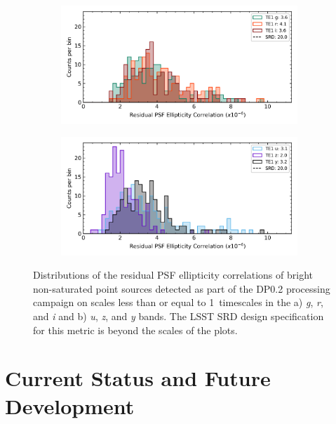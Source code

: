 \begin{figure}[h!]
\begin{subfigure}{.5\textwidth}
    \centering
    \includegraphics[width=0.98\textwidth]{figures/dp02_te1_alltracts_gri}
\end{subfigure}
\begin{subfigure}{.5\textwidth}
    \centering
    \includegraphics[width=0.98\textwidth]{figures/dp02_te1_alltracts_uzy}
\end{subfigure}
\par\medskip
\caption{\label{fig:faro_dp02_distr_te1}
Distributions of the residual PSF ellipticity correlations of bright non-saturated  point sources  detected as part of the DP0.2 processing campaign on scales less than or equal to 1\arcmin\, timescales in the a) \emph{g}, \emph{r}, and \emph{i} and  b) \emph{u}, \emph{z}, and \emph{y} bands.
The LSST SRD design specification for this metric is beyond the scales of the plots.}
\end{figure}

\section{Current Status and Future Development} \label{sec:future}


